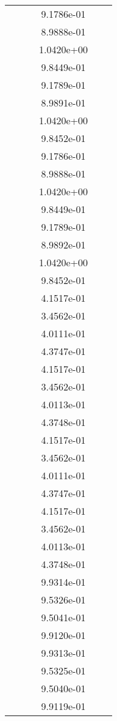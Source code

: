 \begin{xltabular}{\textwidth}{r|rS[table-format=1.3e+2]S[table-format=1.4e+2]S[table-format=1.4e+2]S[table-format=-1.5]}
&  &  & 9.1786e-01 & & \\
&  &  & 8.9888e-01 & & \\
&  &  & 1.0420e+00 & & \\
&  &  & 9.8449e-01 & & \\
&  &  & 9.1789e-01 & & \\
&  &  & 8.9891e-01 & & \\
&  &  & 1.0420e+00 & & \\
&  &  & 9.8452e-01 & & \\
&  &  & 9.1786e-01 & & \\
&  &  & 8.9888e-01 & & \\
&  &  & 1.0420e+00 & & \\
&  &  & 9.8449e-01 & & \\
&  &  & 9.1789e-01 & & \\
&  &  & 8.9892e-01 & & \\
&  &  & 1.0420e+00 & & \\
&  &  & 9.8452e-01 & & \\
&  &  & 4.1517e-01 & & \\
&  &  & 3.4562e-01 & & \\
&  &  & 4.0111e-01 & & \\
&  &  & 4.3747e-01 & & \\
&  &  & 4.1517e-01 & & \\
&  &  & 3.4562e-01 & & \\
&  &  & 4.0113e-01 & & \\
&  &  & 4.3748e-01 & & \\
&  &  & 4.1517e-01 & & \\
&  &  & 3.4562e-01 & & \\
&  &  & 4.0111e-01 & & \\
&  &  & 4.3747e-01 & & \\
&  &  & 4.1517e-01 & & \\
&  &  & 3.4562e-01 & & \\
&  &  & 4.0113e-01 & & \\
&  &  & 4.3748e-01 & & \\
&  &  & 9.9314e-01 & & \\
&  &  & 9.5326e-01 & & \\
&  &  & 9.5041e-01 & & \\
&  &  & 9.9120e-01 & & \\
&  &  & 9.9313e-01 & & \\
&  &  & 9.5325e-01 & & \\
&  &  & 9.5040e-01 & & \\
&  &  & 9.9119e-01 & & \\

\end{xltabular}

